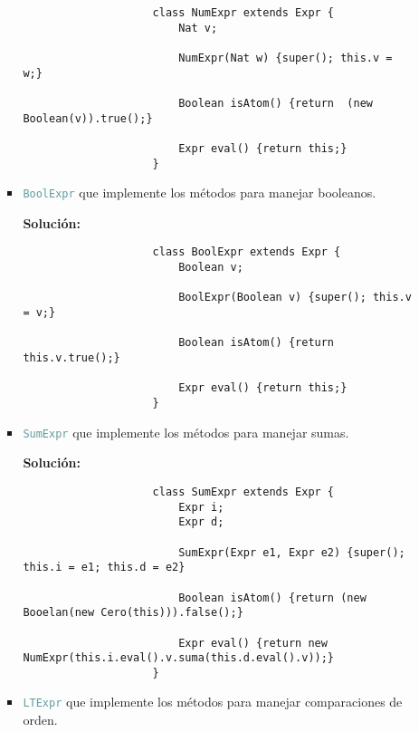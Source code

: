 \documentclass{article}
\newcommand{\tx}[1]{\textcolor{CadetBlue} {\texttt{#1}}}
\newcommand{\tb}[1]{\textcolor{RoyalPurple} {\textbf{#1}}}
\begin{document}
\begin{enumerate}
\begin{enumerate}
\begin{itemize}
                \begin{verbatim}
                    class NumExpr extends Expr {
                        Nat v;

                        NumExpr(Nat w) {super(); this.v = w;}

                        Boolean isAtom() {return  (new Boolean(v)).true();}

                        Expr eval() {return this;}
                    }
                \end{verbatim}

                \item \tx{BoolExpr} que implemente los métodos para manejar 
                booleanos.

                \tb{Solución:}

                \begin{verbatim}
                    class BoolExpr extends Expr {
                        Boolean v;

                        BoolExpr(Boolean v) {super(); this.v = v;}

                        Boolean isAtom() {return this.v.true();}

                        Expr eval() {return this;}
                    }
                \end{verbatim}

                \item \tx{SumExpr} que implemente los métodos para manejar 
                sumas.

                \tb{Solución:}

                \begin{verbatim}
                    class SumExpr extends Expr {
                        Expr i;
                        Expr d;

                        SumExpr(Expr e1, Expr e2) {super(); this.i = e1; this.d = e2}

                        Boolean isAtom() {return (new Booelan(new Cero(this))).false();}

                        Expr eval() {return new NumExpr(this.i.eval().v.suma(this.d.eval().v));}
                    }
                \end{verbatim}

                \item \tx{LTExpr} que implemente los métodos para manejar 
                comparaciones de orden.


\end{itemize}
\end{enumerate}
\end{enumerate}
\end{document}

